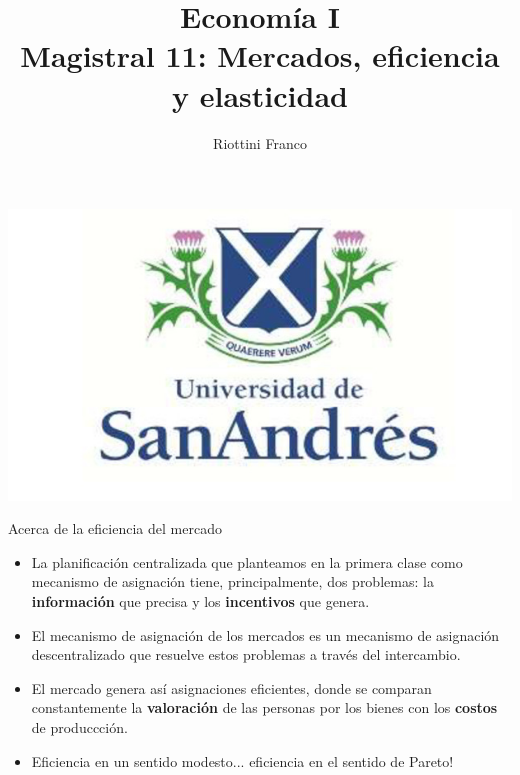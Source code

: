\documentclass{beamer}
\title[Economía I]{Economía I \vspace{4mm}
\\ Magistral 11: Mercados, eficiencia y elasticidad}
\date{}
\author[Riottini]{Riottini Franco}
\institute[]{Universidad de San Andrés}
\begin{document}
\begin{frame}
\titlepage
\centering
\includegraphics[scale=0.2]{../Figures/logoUDESA.jpg} 
\end{frame}

\begin{frame}{Acerca de la eficiencia del mercado}
    \begin{itemize}
      \item La planificación centralizada que planteamos en la primera clase como mecanismo de asignación tiene, principalmente, dos problemas: la \textbf{información} que precisa y los \textbf{incentivos} que genera.
      \item El mecanismo de asignación de los mercados es un mecanismo de asignación descentralizado que resuelve estos problemas a través del intercambio.
      \item El mercado genera así asignaciones eficientes, donde se comparan constantemente la \textbf{valoración} de las personas por los bienes con los \textbf{costos} de produccción.
      \item Eficiencia en un sentido modesto... eficiencia en el sentido de Pareto!
    \end{itemize}
\end{frame}
\end{document}
